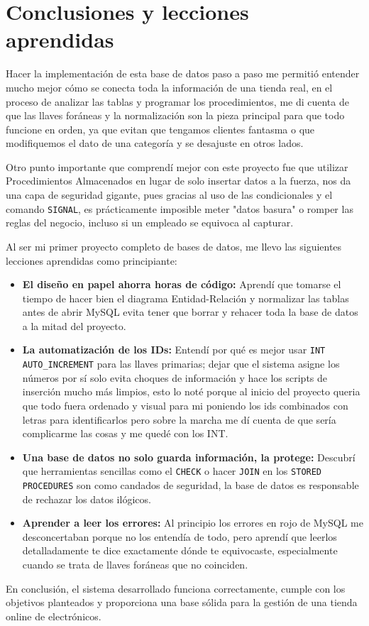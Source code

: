\documentclass[10pt,letterpaper]{article}
\begin{document}
\section{Conclusiones y lecciones aprendidas}
Hacer la implementaci\'on de esta base de datos paso a paso me permiti\'o entender mucho mejor c\'omo se conecta toda la informaci\'on de una tienda real, en el proceso de analizar las tablas y programar los procedimientos, me di cuenta de que las llaves for\'aneas y la normalizaci\'on son la pieza principal para que todo funcione en orden, ya que evitan que tengamos clientes fantasma o que modifiquemos el dato de una categor\'ia y se desajuste en otros lados.

Otro punto importante que comprend\'i mejor con este proyecto fue que utilizar Procedimientos Almacenados en lugar de solo insertar datos a la fuerza, nos da una capa de seguridad gigante, pues gracias al uso de las condicionales y el comando \texttt{SIGNAL}, es pr\'acticamente imposible meter "datos basura" o romper las reglas del negocio, incluso si un empleado se equivoca al capturar.

Al ser mi primer proyecto completo de bases de datos, me llevo las siguientes lecciones aprendidas como principiante:
\begin{itemize}
    \item \textbf{El dise\~no en papel ahorra horas de c\'odigo:} Aprend\'i que tomarse el tiempo de hacer bien el diagrama Entidad-Relaci\'on y normalizar las tablas antes de abrir MySQL evita tener que borrar y rehacer toda la base de datos a la mitad del proyecto.
    \item \textbf{La automatizaci\'on de los IDs:} Entend\'i por qu\'e es mejor usar \texttt{INT AUTO\_INCREMENT} para las llaves primarias; dejar que el sistema asigne los n\'umeros por s\'i solo evita choques de informaci\'on y hace los scripts de inserci\'on mucho m\'as limpios, esto lo noté porque al inicio del proyecto queria que todo fuera ordenado y visual para mi poniendo los ids combinados con letras para identificarlos pero sobre la marcha me dí cuenta de que sería complicarme las cosas y me quedé con los INT.
    \item \textbf{Una base de datos no solo guarda informaci\'on, la protege:} Descubr\'i que herramientas sencillas como el \texttt{CHECK} o hacer \texttt{JOIN} en los \texttt{STORED PROCEDURES} son como candados de seguridad, la base de datos es responsable de rechazar los datos il\'ogicos.
    \item \textbf{Aprender a leer los errores:} Al principio los errores en rojo de MySQL me desconcertaban porque no los entendía de todo, pero aprend\'i que leerlos detalladamente te dice exactamente d\'onde te equivocaste, especialmente cuando se trata de llaves for\'aneas que no coinciden.
\end{itemize}

En conclusi\'on, el sistema desarrollado funciona correctamente, cumple con los objetivos planteados y proporciona una base s\'olida para la gesti\'on de una tienda online de electr\'onicos.
\end{document}
